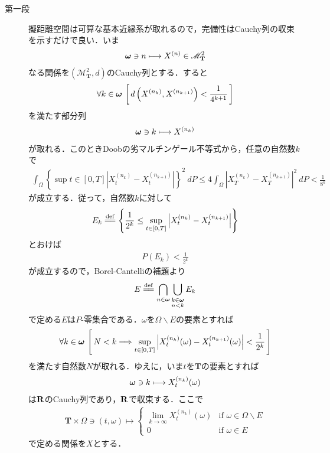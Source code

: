 	\begin{sketch}\mbox{}
		\begin{description}
			\item[第一段] 擬距離空間は可算な基本近縁系が取れるので，完備性はCauchy列の収束を示すだけで良い．いま
				\begin{align}
					{\boldsymbol \omega} \ni n \longmapsto X^{(n)} \in \mathscr{M}^2_{\mathbf{T}}
				\end{align}
				なる関係を$\left(\mathscr{M}^2_{\mathbf{T}},d\right)$のCauchy列とする．すると
				\begin{align}
					\forall k \in {\boldsymbol \omega}\, \left[\, d\left( X^{(n_k)},X^{(n_{k+1})} \right) < \frac{1}{4^{k+1}}\, \right]
				\end{align}
				を満たす部分列
				\begin{align}
					{\boldsymbol \omega} \ni k \longmapsto X^{(n_k)}
				\end{align}
				が取れる．このときDoobの劣マルチンゲール不等式から，任意の自然数$k$で
				\begin{align}
					\int_\Omega \left\{ \sup{t \in [0,T]}{\left|X_t^{(n_k)} - X_t^{(n_{k+1})}\right|} \right\}^2\ dP
					\leq 4 \int_\Omega \left|X_T^{(n_k)} - X_T^{(n_{k+1})}\right|^2\ dP
					< \frac{1}{8^k}
					\label{fom:thm_pseudo_metric_on_square_integrable_martingales_2}
				\end{align}
				が成立する．従って，自然数$k$に対して
				\begin{align}
					E_k \defeq \left\{ \frac{1}{2^k} \leq \sup{t \in [0,T]}{\left|X_t^{(n_k)} - X_t^{(n_{k+1})}\right|} \right\}
				\end{align}
				とおけば
				\begin{align}
					P(E_k) < \frac{1}{2^k}
				\end{align}
				が成立するので，Borel-Cantelliの補題より
				\begin{align}
					E \defeq \bigcap_{n \in \Natural} \bigcup_{\substack{k \in \Natural \\ n < k}} E_k
				\end{align}
				で定める$E$は$P$-零集合である．$\omega$を$\Omega \backslash E$の要素とすれば
				\begin{align}
					\forall k \in {\boldsymbol \omega}\,
					\left[\, N < k \Longrightarrow \operatorname*{sup}_{t \in [0,T]} \left|X_t^{(n_k)}(\omega) - X_t^{(n_{k+1})}(\omega)\right| < \frac{1}{2^k}\, \right]
					\label{fom:thm_pseudo_metric_on_square_integrable_martingales_1}
				\end{align}
				を満たす自然数$N$が取れる．ゆえに，いま$t$を$\mathbf{T}$の要素とすれば
				\begin{align}
					{\boldsymbol \omega} \ni k \longmapsto X_t^{(n_k)}(\omega)
				\end{align}
				は$\mathbf{R}$のCauchy列であり，$\mathbf{R}$で収束する．ここで
				\begin{align}
					\mathbf{T} \times \Omega \ni (t,\omega) \longmapsto
					\begin{cases}
						\lim_{k \to \infty} X_t^{(n_k)}(\omega) & \mbox{if } \omega \in \Omega \backslash E \\
						0 & \mbox{if } \omega \in E
					\end{cases} 
				\end{align}
				で定める関係を$X$とする．
			

\end{description}
\end{sketch}
